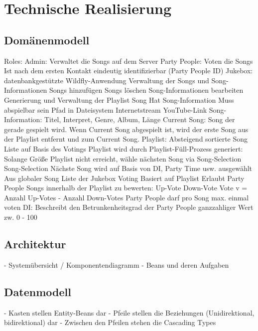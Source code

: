 \section{Technische Realisierung}

\subsection{Domänenmodell}
Roles:
Admin: 
Verwaltet die Songs auf dem Server
Party People:
Voten die Songs
Ist nach dem ersten Kontakt eindeutig identifizierbar (Party People ID)
Jukebox: datenbankgestützte Wildfly-Anwendung
Verwaltung der Songs und Song-Informationen
Songs hinzufügen
Songs löschen 
Song-Informationen bearbeiten
Generierung und Verwaltung der Playlist
Song
Hat Song-Information
Muss abspielbar sein
Pfad in Dateisystem
Internetstream
YouTube-Link
Song-Information:
Titel, Interpret, Genre, Album, Länge
Current Song:
Song der gerade gespielt wird.
Wenn Current Song abgespielt ist, wird der erste Song aus der Playlist entfernt und zum Current Song.
Playlist:
Absteigend sortierte Song Liste auf Basis des Votings
Playlist wird durch Playlist-Füll-Prozess generiert:
Solange Größe Playlist nicht erreicht, wähle nächsten Song via Song-Selection
Song-Selection
Nächste Song wird auf Basis von DI, Party Time usw. ausgewählt
Aus globaler Song Liste der Jukebox
Voting
Basiert auf Playlist
Erlaubt Party People Songs innerhalb der Playlist zu bewerten:
Up-Vote
Down-Vote
Vote v = Anzahl Up-Votes - Anzahl Down-Votes
Party People darf pro Song max. einmal voten
DI:
Beschreibt den Betrunkenheitsgrad der Party People
ganzzahliger Wert zw. 0 - 100


\subsection{Architektur}
- Systemübersicht / Komponentendiagramm
- Beans und deren Aufgaben


\subsection{Datenmodell}

- Kasten stellen Entity-Beans dar
- Pfeile stellen die Beziehungen (Unidirektional, bidirektional) dar
- Zwischen den Pfeilen stehen die Cascading Types

